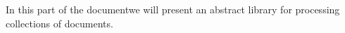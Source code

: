 
In \ifbook this part of the {\report}\else document\fi we will present an abstract library
for processing collections of {\omdoc} documents.

